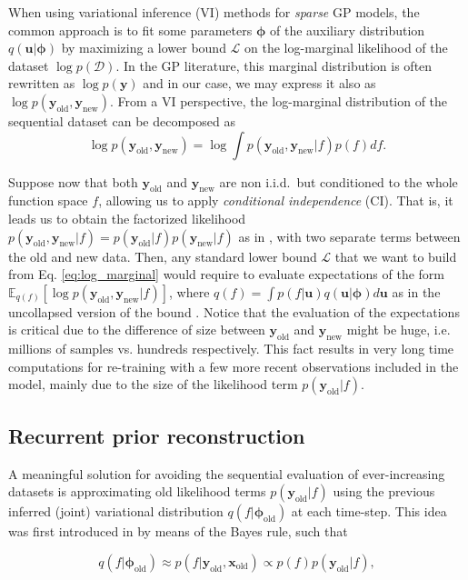 \documentclass[]{article}
\def\u{{\mathbf u}}
\newcommand{\Dcal}{\mathcal{D}}
\newcommand{\Lcal}{\mathcal{L}}
\newcommand{\xc}{\bm{x}}
\newcommand{\yc}{\bm{y}}
\newcommand{\ycnew}{{\yc_{\text{new}}}}
\newcommand{\xcold}{{\xc_{\text{old}}}}
\newcommand{\ycold}{{\yc_{\text{old}}}}
\newcommand{\phiold}{{\bm{\phi}_{\text{old}}}}
\begin{document}
When using variational inference (VI) methods for \textit{sparse} GP models, the common approach is to fit some parameters $\bm{\phi}$ of the auxiliary distribution $q(\u|\bm{\phi})$ by maximizing a lower bound $\Lcal$ on the log-marginal likelihood of the dataset $\log p(\Dcal)$. In the GP literature, this marginal distribution is often rewritten as $\log p(\yc)$ and in our case, we may express it also as $\log p(\ycold, \ycnew)$. From a VI perspective, the log-marginal distribution of the sequential dataset can be decomposed as 
\begin{equation}
	\label{eq:log_marginal}
	\log p(\ycold, \ycnew) = \log \int p(\ycold, \ycnew|f)p(f)df.
\end{equation}

Suppose now that both $\ycold$ and $\ycnew$ are non i.i.d.\ but conditioned to the whole function space $f$, allowing us to apply \textit{conditional independence} (CI). That is, it leads us to obtain the factorized likelihood $p(\ycold, \ycnew|f) = p(\ycold|f)p(\ycnew|f)$ as in \citet{bui2017streaming}, with two separate terms between the old and new data. Then, any standard lower bound $\Lcal$ that we want to build from Eq.  \eqref{eq:log_marginal} would require to evaluate expectations of the form $\mathbb{E}_{q(f)}[ \log p(\ycold, \ycnew|f)]$, where $q(f) = \int p(f|\u)q(\u|\bm{\phi})d\u$ as in the uncollapsed version of the bound \citep{lazaro2011variational,hensman2012fast}. Notice that the evaluation of the expectations is critical due to the difference of size between $\ycold$ and $\ycnew$ might be huge, i.e. millions of samples vs. hundreds respectively. This fact results in very long time computations for re-training with a few more recent observations included in the model, mainly due to the size of the likelihood term $p(\ycold|f)$.

\subsection{Recurrent prior reconstruction}

A meaningful solution for avoiding the sequential evaluation of ever-increasing datasets is approximating old likelihood terms $p(\ycold|f)$ using the previous inferred (joint) variational distribution $q(f|\phiold)$ at each time-step. This idea was first introduced in \citet{bui2017streaming} by means of the Bayes rule, such that

\begin{equation}
	q(f|\phiold) \approx p(f|\ycold, \xcold) \propto p(f)p(\ycold|f),
\end{equation}
\end{document}
